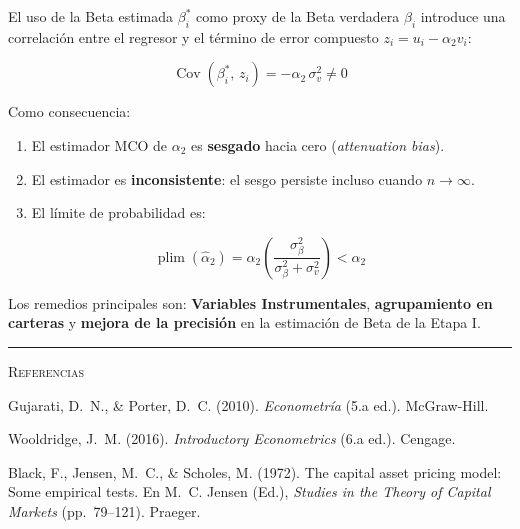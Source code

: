 \documentclass[12pt,letterpaper]{article}
\newcommand{\Cov}{\operatorname{Cov}}
\newcommand{\plim}{\operatorname{plim}}
\begin{document}
\begin{clave}

El uso de la Beta estimada $\beta_{i}^{*}$ como proxy de la Beta
verdadera $\beta_{i}$ introduce una correlación entre el regresor
y el término de error compuesto $z_{i} = u_{i} - \alpha_{2} v_{i}$:

\begin{equation*}
\Cov(\beta_{i}^{*},\, z_{i}) = -\alpha_{2}\,\sigma_{v}^{2} \neq 0
\end{equation*}

Como consecuencia:

\begin{enumerate}[leftmargin=1.8em]
\item El estimador MCO de $\alpha_{2}$ es \textbf{sesgado} hacia cero
      (\textit{attenuation bias}).
\item El estimador es \textbf{inconsistente}: el sesgo persiste
      incluso cuando $n \to \infty$.
\item El límite de probabilidad es:
\end{enumerate}

\begin{equation*}
\plim(\hat{\alpha}_{2})
= \alpha_{2}
  \left(
    \frac{\sigma_{\beta}^{2}}{\sigma_{\beta}^{2} + \sigma_{v}^{2}}
  \right)
< \alpha_{2}
\end{equation*}

Los remedios principales son: \textbf{Variables Instrumentales},
\textbf{agrupamiento en carteras} y \textbf{mejora de la precisión}
en la estimación de Beta de la Etapa I.

\end{clave}

\vspace{12pt}

\noindent\rule{\linewidth}{0.4pt}

\vspace{10pt}

\begin{center}
\small\textsc{Referencias}
\end{center}

\vspace{6pt}

\noindent
Gujarati, D.~N., \& Porter, D.~C. (2010).
\textit{Econometría} (5.a ed.).
McGraw-Hill.

\vspace{6pt}

\noindent
Wooldridge, J.~M. (2016).
\textit{Introductory Econometrics} (6.a ed.).
Cengage.

\vspace{6pt}

\noindent
Black, F., Jensen, M.~C., \& Scholes, M. (1972).
The capital asset pricing model: Some empirical tests.
En M.~C. Jensen (Ed.),
\textit{Studies in the Theory of Capital Markets}
(pp.\ 79--121). Praeger.

\end{document}
